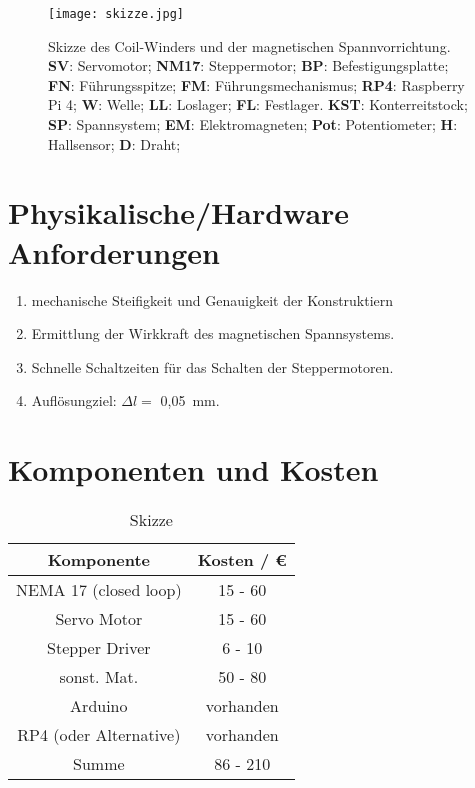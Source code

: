 \begin{figure}[H]
    \centering
    \texttt{[image: skizze.jpg]}
    \caption{
        Skizze des Coil-Winders und der magnetischen Spannvorrichtung.
        \textbf{SV}: Servomotor; 
        \textbf{NM17}: Steppermotor; 
        \textbf{BP}: Befestigungsplatte; 
        \textbf{FN}: Führungsspitze; 
        \textbf{FM}: Führungsmechanismus; 
        \textbf{RP4}: Raspberry Pi 4; 
        \textbf{W}: Welle; 
        \textbf{LL}: Loslager; 
        \textbf{FL}: Festlager.
        \textbf{KST}: Konterreitstock;
        \textbf{SP}: Spannsystem;
        \textbf{EM}: Elektromagneten;
        \textbf{Pot}: Potentiometer;
        \textbf{H}: Hallsensor;
        \textbf{D}: Draht;
    }
\end{figure}


\section*{Physikalische/Hardware Anforderungen}
\begin{enumerate}
    \item mechanische Steifigkeit und Genauigkeit der Konstruktiern
    \item Ermittlung der Wirkkraft des magnetischen Spannsystems.
    \item Schnelle Schaltzeiten für das Schalten der Steppermotoren.
    \item Auflösungziel: $\Delta l =$ 0,05~mm.
\end{enumerate}


\section*{Komponenten und Kosten}
\begin{table}[H]
    \centering
    \caption{
        Skizze
    }
    \begin{tabular}{| c | c |}
        \hline
        Komponente &  Kosten / \euro{}\\
        \hline
        NEMA 17 (closed loop)& 15 - 60  \\
        \hline
        Servo Motor & 15 - 60  \\
        \hline
        Stepper Driver & 6 - 10  \\
        \hline
        sonst. Mat. & 50 - 80 \\
        \hline
        Arduino & vorhanden \\
        \hline
        RP4 (oder Alternative) & vorhanden \\
        \hline
        \hline
        Summe & 86 - 210  \\
        \hline
    \end{tabular}
\end{table}



